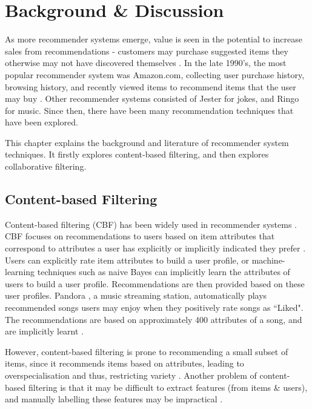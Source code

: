 \chapter{Background \& Discussion}\label{C:background}

As more recommender systems emerge, value is seen in the potential to increase sales from recommendations - customers may purchase suggested items they otherwise may not have discovered themselves \cite{schafer2007collaborative}. In the late 1990's, the most popular recommender system was Amazon.com, collecting user purchase history, browsing history, and recently viewed items to recommend items that the user may buy \cite{schafer2007collaborative}. Other recommender systems consisted of Jester \cite{goldberg} for jokes, and Ringo \cite{ringo} for music. Since then, there have been many recommendation techniques that have been explored. 

This chapter explains the background and literature of recommender system techniques. It firstly explores content-based filtering, and then explores collaborative filtering.

\section{Content-based Filtering}

Content-based filtering (CBF) has been widely used in recommender systems \cite{koren2011, hybrid,toward, bogers2009collaborative}. CBF focuses on recommendations to users based on item attributes that correspond to attributes a user has explicitly or implicitly indicated they prefer \cite{koren2011}. Users can explicitly rate item attributes to build a user profile, or machine-learning techniques such as naive Bayes \cite{koren2011, bogers2009collaborative} can implicitly learn the attributes of users to build a user profile. Recommendations are then provided based on these user profiles. Pandora \cite{pandora, howepandora}, a music streaming station, automatically plays recommended songs users may enjoy when they positively rate songs as ``Liked". The recommendations are based on approximately 400 attributes of a song, and are implicitly learnt \cite{howepandora}.

However, content-based filtering is prone to recommending a small subset of items, since it recommends items based on attributes, leading to overspecialisation and thus, restricting variety \cite{toward}. Another problem of content-based filtering is that it may be difficult to extract features (from items \& users), and manually labelling these features may be impractical \cite{toward}.

